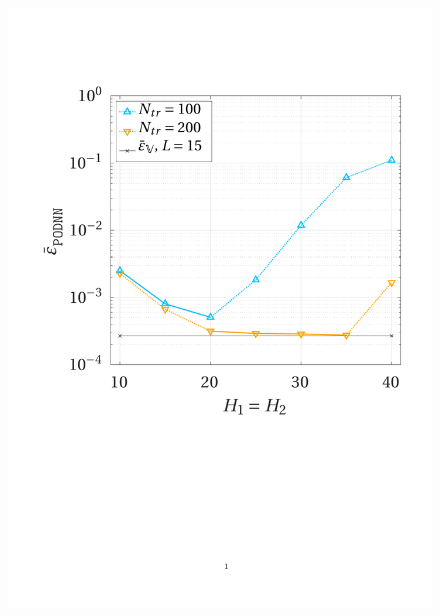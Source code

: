 \documentclass[12pt, a4paper, twoside, openright]{report}
\numberwithin{equation}{chapter}
\theoremstyle{theorem}
\theoremstyle{definition}
\theoremstyle{remark}
\theoremstyle{proposition}
\numberwithin{figure}{chapter}
\begin{document}
		\begin{figure}[H]
			\center
			\includegraphics[scale = 0.43, trim = {1.5cm 9cm 1.5cm 3.5cm}, clip]{poisson2d_1_nn_convergence}
			\hfill

\end{figure}
\end{document}
